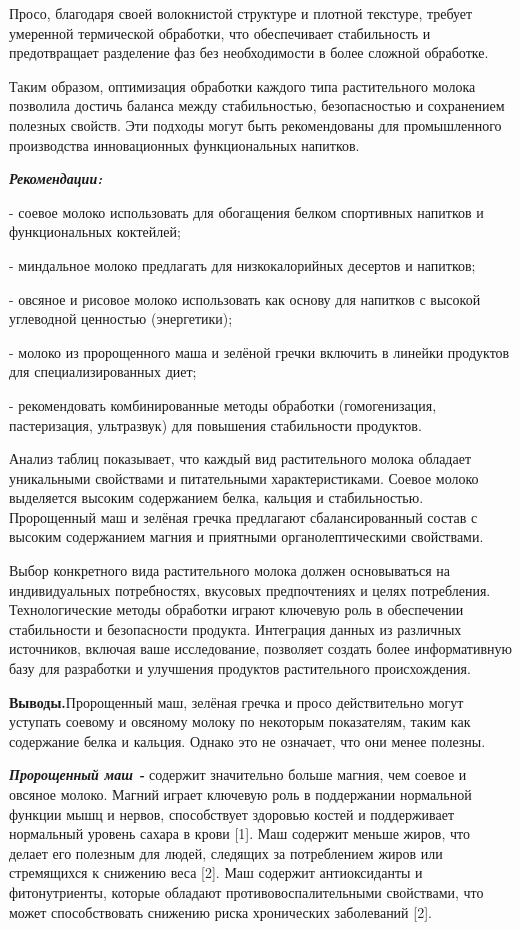 Просо, благодаря своей волокнистой структуре и плотной текстуре, требует
умеренной термической обработки, что обеспечивает стабильность и
предотвращает разделение фаз без необходимости в более сложной
обработке.

Таким образом, оптимизация обработки каждого типа растительного молока
позволила достичь баланса между стабильностью, безопасностью и
сохранением полезных свойств. Эти подходы могут быть рекомендованы для
промышленного производства инновационных функциональных напитков.

\emph{{\bfseries Рекомендации:}}

- соевое молоко использовать для обогащения белком спортивных напитков и
функциональных коктейлей;

- миндальное молоко предлагать для низкокалорийных десертов и напитков;

- овсяное и рисовое молоко использовать как основу для напитков с
высокой углеводной ценностью (энергетики);

- молоко из пророщенного маша и зелёной гречки включить в линейки
продуктов для специализированных диет;

- рекомендовать комбинированные методы обработки (гомогенизация,
пастеризация, ультразвук) для повышения стабильности продуктов.

Анализ таблиц показывает, что каждый вид растительного молока обладает
уникальными свойствами и питательными характеристиками. Соевое молоко
выделяется высоким содержанием белка, кальция и стабильностью.
Пророщенный маш и зелёная гречка предлагают сбалансированный состав с
высоким содержанием магния и приятными органолептическими свойствами.

Выбор конкретного вида растительного молока должен основываться на
индивидуальных потребностях, вкусовых предпочтениях и целях потребления.
Технологические методы обработки играют ключевую роль в обеспечении
стабильности и безопасности продукта. Интеграция данных из различных
источников, включая ваше исследование, позволяет создать более
информативную базу для разработки и улучшения продуктов растительного
происхождения.

{\bfseries Выводы.}Пророщенный маш, зелёная гречка и просо действительно
могут уступать соевому и овсяному молоку по некоторым показателям, таким
как содержание белка и кальция. Однако это не означает, что они менее
полезны.

\emph{{\bfseries Пророщенный маш -}} содержит значительно больше магния,
чем соевое и овсяное молоко. Магний играет ключевую роль в поддержании
нормальной функции мышц и нервов, способствует здоровью костей и
поддерживает нормальный уровень сахара в крови\hspace{0pt} {[}1{]}. Маш
содержит меньше жиров, что делает его полезным для людей, следящих за
потреблением жиров или стремящихся к снижению веса {[}2{]}. Маш содержит
антиоксиданты и фитонутриенты, которые обладают противовоспалительными
свойствами, что может способствовать снижению риска хронических
заболеваний {[}2{]}.

